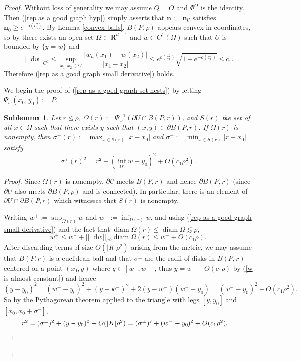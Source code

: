 \documentclass[reqno,11pt]{amsart}
\newcommand{\RR}{\mathbf{R}}
\DeclareMathOperator{\diam}{diam}
\newcommand*\dif{\mathop{}\!\mathrm{d}}
\newcommand{\normal}{\mathbf n}
\newtheorem{sublemma}[theorem]{Sublemma}
\theoremstyle{definition}
\numberwithin{equation}{section}
\begin{document}
\begin{proof}
Without loss of generality we may assume $Q = O$ and $\Phi^O$ is the identity. Then (\ref{rep as a good graph hyp}) simply asserts that $\normal := \normal_U$ satisfies $\normal_0 \geq e^{-o(c_1^2)}$.
By Lemma \ref{convex balls}, $B(P, \rho)$ appears convex in coordinates, so by \cite[Theorem 4.8]{Giusti77} there exists an open set $\Omega \subset \RR^{d - 1}$ and $w \in C^1(\Omega)$ such that $U$ is bounded by $\{y = w\}$ and
$$||\dif w||_{C^0} \leq \sup_{x_1, x_2 \in \Omega} \frac{|w_n(x_1) - w(x_2)|}{|x_1 - x_2|} \leq e^{o(c_1^2)}\sqrt{1 - e^{-o(c_1^2)}} \leq c_1.$$
Therefore (\ref{rep as a good graph small derivative}) holds.

We begin the proof of (\ref{rep as a good graph set nests}) by letting $\Psi_w(x_0, y_0) := P$.

\begin{sublemma}
Let $r \leq \rho$, $\Omega(r) := \Psi_w^{-1}(\partial U \cap B(P, r))$, and $S(r)$ the set of all $x \in \Omega$ such that there exists $y$ such that $(x, y) \in \partial B(P, r)$.
If $\Omega(r)$ is nonempty, then $\sigma^+(r) := \max_{x \in S(r)} |x - x_0|$ and $\sigma^- := \min_{x \in S(r)} |x - x_0|$ satisfy
$$\sigma^\pm(r)^2 = r^2 - (\inf_{\Omega'} w - y_0)^2 + O(c_1 \rho^2).$$
\end{sublemma}
\begin{proof}
Since $\Omega(r)$ is nonempty, $\partial U$ meets $B(P, r)$ and hence $\partial B(P, r)$ (since $\partial U$ also meets $\partial B(P, \rho)$ and is connected).
In particular, there is an element of $\partial U \cap \partial B(P, r)$ which witnesses that $S(r)$ is nonempty.

Writing $w^+ := \sup_{\Omega(r)} w$ and $w^- := \inf_{\Omega(r)} w$, and using (\ref{rep as a good graph small derivative}) and the fact that $\diam \Omega(r) \leq \diam \Omega \lesssim \rho$,
\begin{equation}\label{w is almost constant}
w^+ \leq w^- + ||\dif w||_{C^0} \diam \Omega(r) \leq w^- + O(c_1 \rho).
\end{equation}
After discarding terms of size $O(|K| \rho^2)$ arising from the metric, we may assume that $B(P, r)$ is a euclidean ball and that $\sigma^\pm$ are the radii of disks in $B(P, r)$ centered on a point $(x_0, y)$ where $y \in [w^-, w^+]$, thus $y = w^- + O(c_1 \rho)$ by (\ref{w is almost constant}) and hence
$$(y - y_0)^2 = (w^- - y_0)^2 + (y - w^-)^2 + 2(y - w^-)(w^- - y_0) = (w^- - y_0)^2 + O(c_1 \rho^2).$$
So by the Pythagorean theorem applied to the triangle with legs $[y, y_0]$ and $[x_0, x_0 + \sigma^\pm]$,
\begin{align*}
r^2 &= (\sigma^\pm)^2 + (y - y_0)^2 + O(|K| \rho^2) = (\sigma^\pm)^2 + (w^- - y_0)^2 + O(c_1 \rho^2). \qedhere
\end{align*}
\end{proof}


\end{proof}
\end{document}
